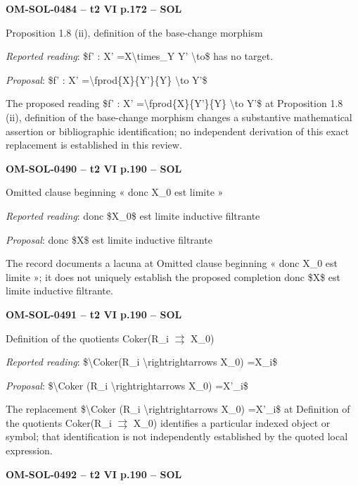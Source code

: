 \par\noindent\textbf{OM-SOL-0484 -- t2 VI p.172 -- SOL}\par
Proposition 1.8 (ii), definition of the base-change morphism\par
\emph{Reported reading}: \$f' : X' =\allowbreak  X\textbackslash{}times\_Y Y' \textbackslash{}to\$ has no target.\par
\emph{Proposal}: \$f' : X' =\allowbreak  \textbackslash{}fprod\{X\}\{Y'\}\{Y\} \textbackslash{}to Y'\$\par
The proposed reading \$f' : X' =\allowbreak  \textbackslash{}fprod\{X\}\{Y'\}\{Y\} \textbackslash{}to Y'\$ at Proposition 1.8 (ii), definition of the base-change morphism changes a substantive mathematical assertion or bibliographic identification; no independent derivation of this exact replacement is established in this review.\par
\par\noindent\textbf{OM-SOL-0490 -- t2 VI p.190 -- SOL}\par
Omitted clause beginning « donc X\_0 est limite »\par
\emph{Reported reading}: donc \$X\_0\$ est limite inductive filtrante\par
\emph{Proposal}: donc \$X\$ est limite inductive filtrante\par
The record documents a lacuna at Omitted clause beginning « donc X\_0 est limite »; it does not uniquely establish the proposed completion donc \$X\$ est limite inductive filtrante.\par
\par\noindent\textbf{OM-SOL-0491 -- t2 VI p.190 -- SOL}\par
Definition of the quotients Coker(R\_i \ensuremath{\rightrightarrows} X\_0)\par
\emph{Reported reading}: \$\textbackslash{}Coker(R\_i \textbackslash{}rightrightarrows X\_0) =\allowbreak  X\_i\$\par
\emph{Proposal}: \$\textbackslash{}Coker (R\_i \textbackslash{}rightrightarrows X\_0) =\allowbreak  X'\_i\$\par
The replacement \$\textbackslash{}Coker (R\_i \textbackslash{}rightrightarrows X\_0) =\allowbreak  X'\_i\$ at Definition of the quotients Coker(R\_i \ensuremath{\rightrightarrows} X\_0) identifies a particular indexed object or symbol; that identification is not independently established by the quoted local expression.\par
\par\noindent\textbf{OM-SOL-0492 -- t2 VI p.190 -- SOL}\par

